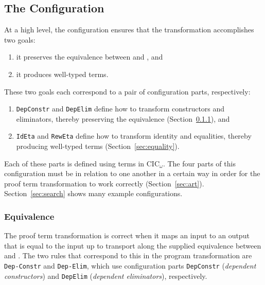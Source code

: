 \subsection{The Configuration}
\label{sec:configurable}

At a high level, the configuration ensures that the transformation accomplishes two goals:

\begin{enumerate}
\item it preserves the equivalence between \A and \B, and
\item it produces well-typed terms.
\end{enumerate}
These two goals each correspond to a pair of configuration parts, respectively:

\begin{enumerate}
\item \lstinline{DepConstr} and \lstinline{DepElim} define how to transform constructors and eliminators, thereby preserving the equivalence (Section~\ref{sec:equivalence}), and 
\item \lstinline{IdEta} and \lstinline{RewEta} define how to transform identity and equalities, thereby producing well-typed terms (Section~\ref{sec:equality}).
\end{enumerate}

Each of these parts is defined using terms in CIC$_{\omega}$.
The four parts of this configuration must be in relation to one another in a certain way in order for the proof
term transformation to work correctly (Section~\ref{sec:art}).
Section~\ref{sec:search} shows many example configurations.

\subsubsection{Equivalence}
\label{sec:equivalence}

The proof term transformation is correct when it maps an input to an output that is equal
to the input up to transport along the supplied equivalence between \A and \B.
The two rules that correspond to this in the program transformation are \lstinline{Dep-Constr} and \lstinline{Dep-Elim},
which use configuration parts \lstinline{DepConstr} (\textit{dependent constructors}) and \lstinline{DepElim} (\textit{dependent eliminators}), respectively.

